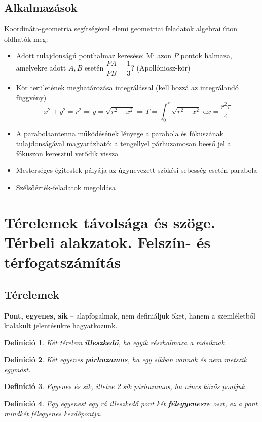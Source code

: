 \documentclass[12pt,a4paper]{article}
\newtheorem{definition}{Definíció} [section]
\begin{document}
\subsection{Alkalmazások}
Koordináta-geometria segítségével elemi geometriai feladatok algebrai úton oldhatók meg:
\begin{itemize}
\item Adott tulajdonságú ponthalmaz keresése: Mi azon $P$ pontok halmaza, amelyekre adott $A, B$ esetén $\dfrac{PA}{PB}=\dfrac{1}{3}$? (Apollóniosz-kör)
\item Kör területének meghatározása integrálással (kell hozzá az integrálandó függvény)
$$x^2+y^2=r^2\Rightarrow y = \sqrt{r^2-x^2}\Rightarrow T=\int_0^r\sqrt{r^2-x^2}\text{ d}x=\dfrac{r^2\pi}{4}$$
\item A parabolaantenna működésének lényege a parabola és fókuszának tulajdonságával magyarázható: a tengellyel párhuzamosan beeső jel a fókuszon keresztül verődik vissza
\item Mesterséges égitestek pályája az úgynevezett szökési sebesség esetén parabola
\item Szélsőérték-feladatok megoldása
\end{itemize}
\newpage



\section{Térelemek távolsága és szöge. Térbeli alakzatok. Felszín- és térfogatszámítás}
\subsection{Térelemek}
\textbf{Pont, egyenes, sík} – alapfogalmak, nem definiáljuk őket, hanem a szemléletből kialakult jelentésükre hagyatkozunk.

\begin{definition}
Két térelem \textbf{illeszkedő}, ha egyik részhalmaza a másiknak.
\end{definition}

\begin{definition}
Két egyenes \textbf{párhuzamos}, ha egy síkban vannak és nem metszik egymást.
\end{definition}

\begin{definition}
Egyenes és sík, illetve 2 sík párhuzamos, ha nincs közös pontjuk.
\end{definition}

\begin{definition}
Egy egyenest egy rá illeszkedő pont két \textbf{félegyenesre} oszt, ez a pont mindkét félegyenes kezdőpontja.
\end{definition}
\end{document}
